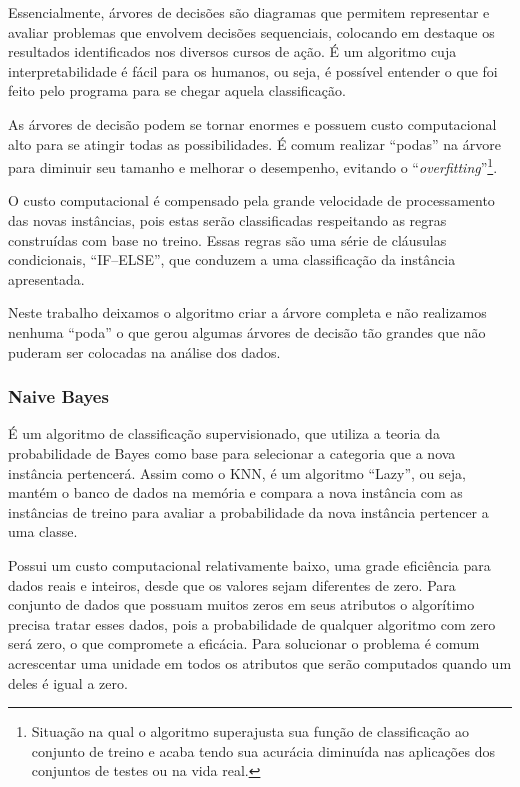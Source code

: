 \documentclass[12pt, a4paper]{article}
\begin{document}
Essencialmente, árvores de decisões são diagramas que permitem representar e avaliar problemas que envolvem decisões sequenciais, colocando em destaque os resultados identificados nos diversos cursos de ação. É um algoritmo cuja interpretabilidade é fácil para os humanos, ou seja, é possível entender o que foi feito pelo programa para se chegar aquela classificação.

As árvores de decisão podem se tornar enormes e possuem custo computacional alto para se atingir todas as possibilidades. É comum realizar ``podas'' na árvore para diminuir seu tamanho e melhorar o desempenho, evitando o ``\textit{overfitting}''\footnote{Situação na qual o algoritmo superajusta sua função de classificação ao conjunto de treino e acaba tendo sua acurácia diminuída nas aplicações dos conjuntos de testes ou na vida real.}.

O custo computacional é compensado pela grande velocidade de processamento das novas instâncias, pois estas serão classificadas respeitando as regras construídas com base no treino. Essas regras são uma série de cláusulas condicionais, ``IF--ELSE'', que conduzem a uma classificação da instância apresentada.

Neste trabalho deixamos o algoritmo criar a árvore completa e não realizamos nenhuma ``poda'' o que gerou algumas árvores de decisão tão grandes que não puderam ser colocadas na análise dos dados.

\subsubsection{Naive Bayes}
É um algoritmo de classificação supervisionado, que utiliza a teoria da probabilidade de Bayes como base para selecionar a categoria que a nova instância pertencerá. Assim como o KNN, é um algoritmo ``Lazy'', ou seja, mantém o banco de dados na memória e compara a nova instância com as instâncias de treino para avaliar a probabilidade da nova instância pertencer a uma classe.

Possui um custo computacional relativamente baixo, uma grade eficiência para dados reais e inteiros, desde que os valores sejam diferentes de zero. Para conjunto de dados que possuam muitos zeros em seus atributos o algorítimo precisa tratar esses dados, pois a probabilidade de qualquer algoritmo com zero será zero, o que compromete a eficácia. Para solucionar o problema é comum acrescentar uma unidade em todos os atributos que serão computados quando um deles é igual a zero.
\end{document}

